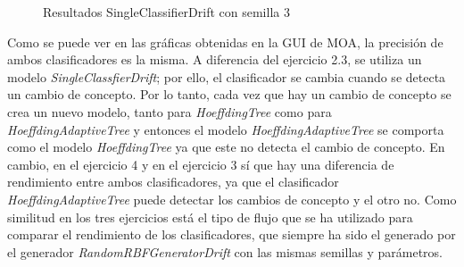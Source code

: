 \begin{figure}[H]
	\centering
	\caption{Resultados SingleClassifierDrift con semilla 3}
	\label{fig:res53}
\end{figure}

Como se puede ver en las gráficas obtenidas en la GUI de MOA, la precisión
de ambos clasificadores es la misma. A diferencia del ejercicio 2.3,
se utiliza un modelo \textit{SingleClassfierDrift}; por ello, el clasificador se
cambia cuando se detecta un cambio de concepto. Por lo tanto, cada vez que
hay un cambio de concepto se crea un nuevo modelo, tanto para \textit{HoeffdingTree}
como para \textit{HoeffdingAdaptiveTree} y entonces el modelo \textit{HoeffdingAdaptiveTree} se comporta como el modelo \textit{HoeffdingTree} ya que este no detecta el cambio
de concepto. En cambio, en el ejercicio 4 y en el ejercicio 3 sí que hay una diferencia de rendimiento entre ambos clasificadores, ya que el clasificador \textit{HoeffdingAdaptiveTree} puede detectar los cambios de concepto y el otro no. Como similitud en los tres ejercicios está el tipo de flujo que se ha utilizado para comparar el rendimiento de los clasificadores, que siempre ha sido el generado por el generador \textit{RandomRBFGeneratorDrift} con las mismas semillas y parámetros.

